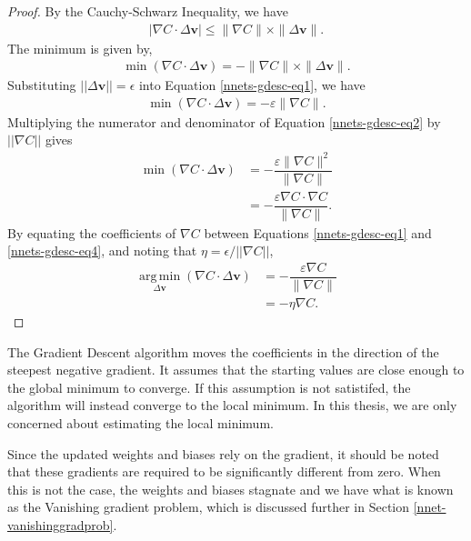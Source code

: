 \begin{proof}
	By the Cauchy-Schwarz Inequality, we have
	\begin{align}
			|\nabla C\cdot\Delta\mathbf{v}| \le \|\nabla C\|\times\|\Delta\mathbf{v}\|.
	\end{align}
	The minimum is given by,
	\begin{align}\label{nnets-gdesc-eq1}
		\min(\nabla C\cdot\Delta\mathbf{v}) = -\|\nabla C\|\times\|\Delta\mathbf{v}\|.
	\end{align}
	Substituting $||\Delta\mathbf{v}|| = \epsilon$ into Equation 	\eqref{nnets-gdesc-eq1}, we have
	\begin{align}\label{nnets-gdesc-eq2}
		\min(\nabla C\cdot\Delta\mathbf{v}) = -\varepsilon\|\nabla C\|.
	\end{align}
	Multiplying the numerator and denominator of Equation \eqref{nnets-gdesc-eq2} by $||\nabla C||$ gives
	\begin{align}\label{nnets-gdesc-eq3}
		\min(\nabla C\cdot\Delta\mathbf{v}) & = -\dfrac{\varepsilon\|\nabla C\|^2}{\|\nabla C\|}\\[1em]
		& = -\dfrac{\varepsilon\nabla C\cdot\nabla C}{\|\nabla C\|} \label{nnets-gdesc-eq4}.
	\end{align}
	By equating the coefficients of $\nabla C$ between Equations \eqref{nnets-gdesc-eq1} and \eqref{nnets-gdesc-eq4}, and noting that $\eta = \epsilon / ||\nabla C||$,
	\begin{align}
		\operatorname*{arg\,min}_{\Delta\mathbf{v}}(\nabla C\cdot\Delta\mathbf{v}) & = -\dfrac{\varepsilon\nabla C}{\|\nabla C\|} \\
		& = -\eta\nabla C.
	\end{align}	
\end{proof}

The Gradient Descent algorithm moves the coefficients in the direction of the steepest negative gradient. It assumes that the starting values are close enough to the global minimum to converge. If this assumption is not satistifed, the algorithm will instead converge to the local minimum. In this thesis, we are only concerned about estimating the local minimum.

Since the updated weights and biases rely on the gradient, it should be noted that these gradients are required to be significantly different from zero. When this is not the case, the weights and biases stagnate and we have what is known as the Vanishing gradient problem, which is discussed further in Section \ref{nnet-vanishinggradprob}.

